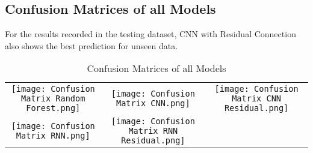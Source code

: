 \documentclass{article}
\begin{document}
\subsection{Confusion Matrices of all Models}
For the results recorded in the testing dataset, CNN with Residual Connection also shows the best prediction for unseen data.
\begin{table}[h]
\centering
\begin{tabular}{ccc}
\texttt{[image: Confusion Matrix Random Forest.png]} & \texttt{[image: Confusion Matrix CNN.png]} & \texttt{[image: Confusion Matrix CNN Residual.png]} \\
\texttt{[image: Confusion Matrix RNN.png]} & \texttt{[image: Confusion Matrix RNN Residual.png]} & \\
\end{tabular}
\caption{Confusion Matrices of all Models}
\end{table}
 
\end{document}
